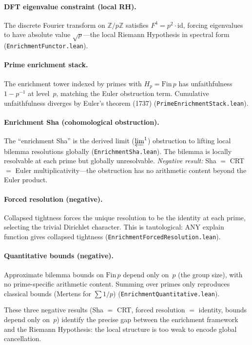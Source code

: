 \documentclass[11pt,a4paper]{article}
\begin{document}
\paragraph{DFT eigenvalue constraint (local RH).}
The discrete Fourier transform on $\mathbb{Z}/p\mathbb{Z}$ satisfies $F^4 = p^2 \cdot \mathrm{id}$, forcing eigenvalues to have absolute value $\sqrt{p}$---the local Riemann Hypothesis in spectral form (\texttt{EnrichmentFunctor.lean}).

\paragraph{Prime enrichment stack.}
The enrichment tower indexed by primes with $H_p = \mathrm{Fin}\,p$ has unfaithfulness $1 - p^{-1}$ at level~$p$, matching the Euler obstruction term.  Cumulative unfaithfulness diverges by Euler's theorem (1737) (\texttt{PrimeEnrichmentStack.lean}).

\paragraph{Enrichment Sha (cohomological obstruction).}
The ``enrichment Sha'' is the derived limit ($\varprojlim^1$) obstruction to lifting local bilemma resolutions globally (\texttt{EnrichmentSha.lean}).  The bilemma is locally resolvable at each prime but globally unresolvable.  \emph{Negative result:} Sha $=$ CRT $=$ Euler multiplicativity---the obstruction has no arithmetic content beyond the Euler product.

\paragraph{Forced resolution (negative).}
Collapsed tightness forces the unique resolution to be the identity at each prime, selecting the trivial Dirichlet character.  This is tautological: ANY explain function gives collapsed tightness (\texttt{EnrichmentForcedResolution.lean}).

\paragraph{Quantitative bounds (negative).}
Approximate bilemma bounds on $\mathrm{Fin}\,p$ depend only on~$p$ (the group size), with no prime-specific arithmetic content.  Summing over primes only reproduces classical bounds (Mertens for $\sum 1/p$) (\texttt{EnrichmentQuantitative.lean}).

These three negative results (Sha $=$ CRT, forced resolution $=$ identity, bounds depend only on~$p$) identify the precise gap between the enrichment framework and the Riemann Hypothesis: the local structure is too weak to encode global cancellation.
\end{document}
